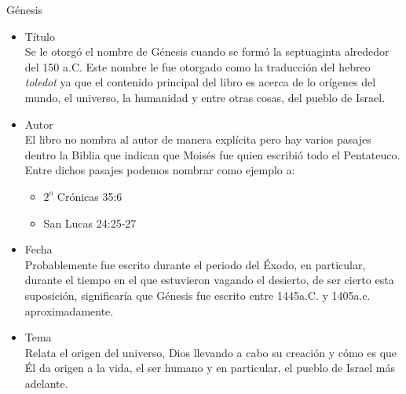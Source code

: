 

%

\begin{section}{Génesis}
	\begin{itemize}
		\item Título\\
		Se le otorgó el nombre de Génesis cuando se formó la septuaginta alrededor del 150 a.C. Este nombre le fue otorgado			como la traducción del hebreo \textit{toledot} ya que el contenido principal del libro es acerca de lo orígenes del 			mundo, el universo, la humanidad y entre otras cosas, del pueblo de Israel.

		\item Autor\\
		El libro no nombra al autor de manera explícita pero hay varios pasajes dentro la Biblia que indican que Moisés fue 			quien escribió todo el Pentateuco. Entre dichos pasajes podemos nombrar como ejemplo a:
		\begin{itemize}
			\item $2^o$ Crónicas 35:6
			\item San Lucas 24:25-27
		\end{itemize}
		\item Fecha\\
		Probablemente fue escrito durante el periodo del Éxodo, en particular, durante el tiempo en el que estuvieron vagando 			el desierto, de ser cierto esta suposición, significaría que  Génesis fue escrito entre 1445a.C. y 1405a.c. 				aproximadamente.

		\item Tema\\
		Relata el origen del universo, Dios llevando a cabo su creación y cómo es que Él da origen a la vida, el ser humano y 			en particular, el pueblo de Israel más adelante.



\end{itemize}
\end{section}
